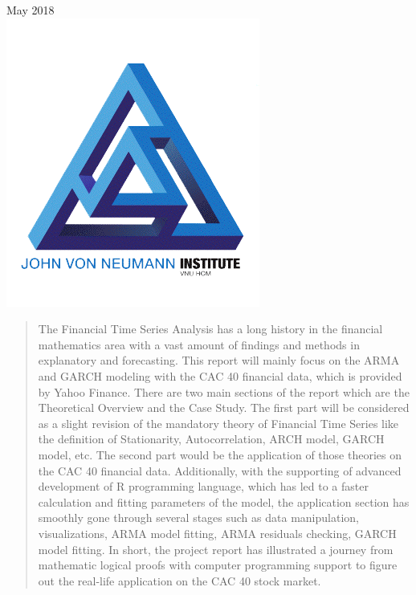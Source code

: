 \documentclass[a4paper]{article}
\begin{document}
\begin{titlepage}


{\large May 2018}\\[2cm] %


\includegraphics[width=0.4\columnwidth]{jvnlogoh.png}\\[1cm] %
 

\vfill %

\end{titlepage}
\newpage
\begin{abstract}
The Financial Time Series Analysis has a long history in the financial mathematics area with a vast amount of findings and methods in explanatory and forecasting. This report will mainly focus on the ARMA and GARCH modeling with the CAC 40 financial data, which is provided by Yahoo Finance. There are two main sections of the report which are the Theoretical Overview and the Case Study. The first part will be considered as a slight revision of the mandatory theory of Financial Time Series like the definition of Stationarity, Autocorrelation, ARCH model, GARCH model, etc. The second part would be the application of those theories on the CAC 40 financial data. Additionally, with the supporting of advanced development of R programming language, which has led to a faster calculation and fitting parameters of the model, the application section has smoothly gone through several stages such as data manipulation, visualizations, ARMA model fitting, ARMA residuals checking, GARCH model fitting. In short, the project report has illustrated a journey from mathematic logical proofs with computer programming support to figure out the real-life application on the CAC 40 stock market. 
\end{abstract}
\end{document}
